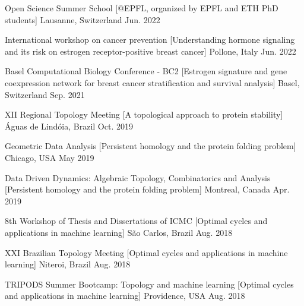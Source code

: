 \begin{cvhonors}

\cvhonor
  {Open Science Summer School}
  [@EPFL, organized by EPFL and ETH PhD students]
  {Lausanne, Switzerland}
  {Jun. 2022}


\cvhonor
  {International workshop on cancer prevention} %
  [Understanding hormone signaling and its risk on estrogen receptor-positive breast cancer] %
  {Pollone, Italy} %
  {Jun. 2022} %

\cvhonor
  {Basel Computational Biology Conference - BC2} %
  [Estrogen signature and gene coexpression network for breast cancer stratification and survival analysis] %
  {Basel, Switzerland} %
  {Sep. 2021} %


\cvhonor
  {XII Regional Topology Meeting} %
  [A topological approach to protein stability] %
  {Águas de Lindóia, Brazil} %
  {Oct. 2019} %


\cvhonor
  {Geometric Data Analysis} %
  [Persistent homology and the protein folding problem] %
  {Chicago, USA} %
  {May 2019} %

\cvhonor
  {Data Driven Dynamics: Algebraic Topology, Combinatorics and Analysis} %
  [Persistent homology and the protein folding problem] %
  {Montreal, Canada} %
  {Apr. 2019} %

\cvhonor
  {8th Workshop of Thesis and Dissertations of ICMC} %
  [Optimal cycles and applications in machine learning] %
  {São Carlos, Brazil} %
  {Aug. 2018} %

\cvhonor
  {XXI Brazilian Topology Meeting} %
  [Optimal cycles and applications in machine learning] %
  {Niteroi, Brazil} %
  {Aug. 2018} %

\cvhonor
  {TRIPODS Summer Bootcamp: Topology and machine learning} %
  [Optimal cycles and applications in machine learning] %
  {Providence, USA} %
  {Aug. 2018} %


\end{cvhonors}
